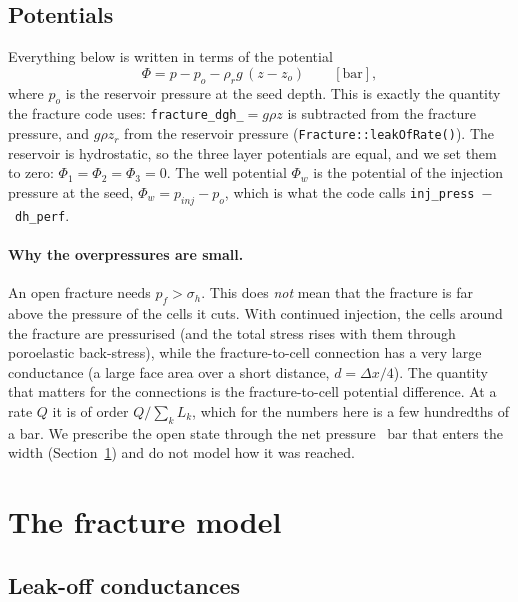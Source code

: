 \documentclass[11pt,a4paper]{article}
\newcommand{\Phiw}{\Phi_w}
\begin{document}
\subsection{Potentials}

Everything below is written in terms of the potential
\begin{equation}
  \Phi = p - p_o - \rho_r g\,(z-z_o)\qquad[\text{bar}],
  \label{eq:potential}
\end{equation}
where $p_o$ is the reservoir pressure at the seed depth.  This is exactly the quantity the
fracture code uses: \texttt{fracture\_dgh\_}$=g\rho z$ is subtracted from the fracture pressure,
and $g\rho z_r$ from the reservoir pressure (\texttt{Fracture::leakOfRate()}).  The reservoir is
hydrostatic, so the three layer potentials are equal, and we set them to zero:
$\Phi_1=\Phi_2=\Phi_3=0$.  The well potential $\Phiw$ is the potential of the injection pressure
at the seed, $\Phiw = p_{inj}-p_o$, which is what the code calls
\texttt{inj\_press}~$-$~\texttt{dh\_perf}.

\paragraph{Why the overpressures are small.}
An open fracture needs $p_f>\sigma_h$.  This does \emph{not} mean that the fracture is far above
the pressure of the cells it cuts.  With continued injection, the cells around the fracture are
pressurised (and the total stress rises with them through poroelastic back-stress), while the
fracture-to-cell connection has a very large conductance (a large face area over a short
distance, $d=\Delta x/4$).  The quantity that matters for the connections is the fracture-to-cell
potential difference.  At a rate $Q$ it is of order $Q/\sum_k L_k$, which for the numbers here is
a few hundredths of a bar.  We prescribe the open state through the net pressure \pnet~bar that
enters the width (Section~\ref{sec:fracture}) and do not model how it was reached.

\section{The fracture model}
\label{sec:fracture}

\subsection{Leak-off conductances}
\end{document}
